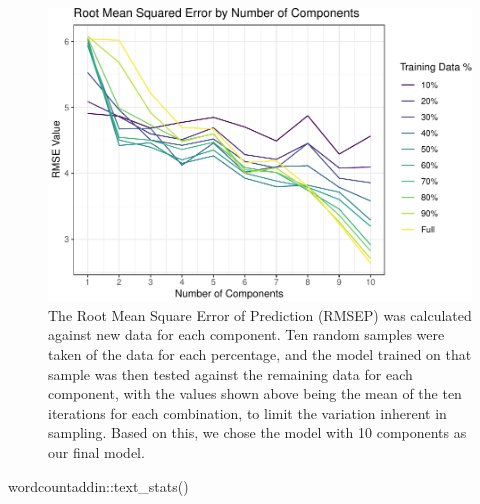 \documentclass[water,article,submit,moreauthors,pdftex]{mdpi}
\begin{document}
\begin{figure}

{\centering \includegraphics{final_paper_draft_files/figure-latex/fig4-1} 

}

\caption{The Root Mean Square Error of Prediction (RMSEP) was calculated against new data for each component. Ten random samples were taken of the data for each percentage, and the model trained on that sample was then tested against the remaining data for each component, with the values shown above being the mean of the ten iterations for each combination, to limit the variation inherent in sampling. Based on this, we chose the model with 10 components as our final model.}\label{fig:fig4}
\end{figure}

wordcountaddin::text\_stats()

%

\vspace{6pt}



\end{document}
